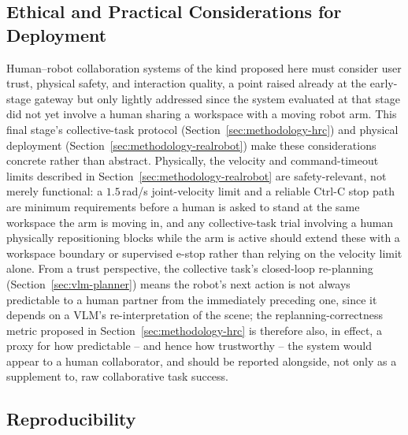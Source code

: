 \documentclass[12pt]{article}
\begin{document}
\subsection{Ethical and Practical Considerations for Deployment}

Human--robot collaboration systems of the kind proposed here must consider user trust, physical safety, and interaction quality, a point raised already at the early-stage gateway but only lightly addressed since the system evaluated at that stage did not yet involve a human sharing a workspace with a moving robot arm. This final stage's collective-task protocol (Section~\ref{sec:methodology-hrc}) and physical deployment (Section~\ref{sec:methodology-realrobot}) make these considerations concrete rather than abstract. Physically, the velocity and command-timeout limits described in Section~\ref{sec:methodology-realrobot} are safety-relevant, not merely functional: a $1.5$\,rad/s joint-velocity limit and a reliable Ctrl-C stop path are minimum requirements before a human is asked to stand at the same workspace the arm is moving in, and any collective-task trial involving a human physically repositioning blocks while the arm is active should extend these with a workspace boundary or supervised e-stop rather than relying on the velocity limit alone. From a trust perspective, the collective task's closed-loop re-planning (Section~\ref{sec:vlm-planner}) means the robot's next action is not always predictable to a human partner from the immediately preceding one, since it depends on a VLM's re-interpretation of the scene; the replanning-correctness metric proposed in Section~\ref{sec:methodology-hrc} is therefore also, in effect, a proxy for how predictable -- and hence how trustworthy -- the system would appear to a human collaborator, and should be reported alongside, not only as a supplement to, raw collaborative task success.

\subsection{Reproducibility}
\end{document}
